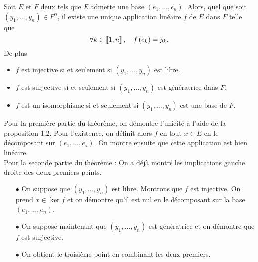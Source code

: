\documentclass{magnolia}
\begin{document}
\begin{proposition}[utile=3]
Soit $E$ et $F$ deux \Kevs tels que $E$ admette une base $(e_1,\ldots,e_n)$.
Alors, quel que soit $(y_1,\ldots,y_n)\in F^n$, il existe une unique application
linéaire $f$ de $E$ dans $F$ telle que
\[\forall k\in\left\llbracket 1,n\right\rrbracket ,\quad f\left(e_k\right)=y_k.\]
De plus
\begin{itemize}
\item $f$ est injective si et seulement si $(y_1,\ldots,y_n)$ est libre.
\item $f$ est surjective si et seulement si $(y_1,\ldots,y_n)$ est génératrice dans $F$.
\item $f$ est un isomorphisme si et seulement si $(y_1,\ldots,y_n)$ est une base de $F$.
\end{itemize}
\end{proposition}

\begin{preuve}
Pour la première partie du théorème, on démontre l'unicité à l'aide de la proposition 1.2.
Pour l'existence, on définit alors $f$ en tout $x\in E$ en le décomposant sur $(e_1,\ldots,e_n)$. On montre ensuite que cette application est bien linéaire.\\


Pour la seconde partie du théorème :
On a déjà montré les implications gauche droite des deux premiers points. 
\begin{itemize}
\item[$\bullet$] On suppose que $(y_1,\ldots,y_n)$ est libre. Montrons que $f$ est injective. On prend $x\in \ker f$ et on démontre qu'il est nul en  le décomposant sur la base $(e_1,\ldots,e_n)$.
\item[$\bullet$] On suppose maintenant que $(y_1,\ldots,y_n)$ est génératrice et on démontre que $f$ est surjective.
\item[$\bullet$] On obtient le troisième point en combinant les deux premiers.
\end{itemize}
\end{preuve}

\end{document}
